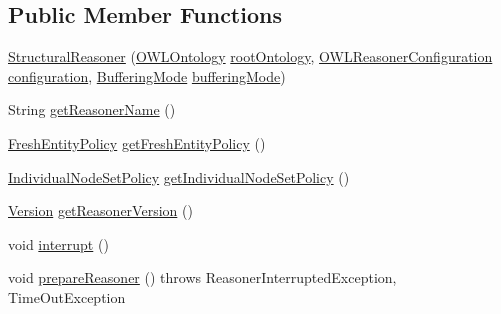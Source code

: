 \subsection*{Public Member Functions}
\begin{DoxyCompactItemize}
\item 
\hyperlink{classorg_1_1semanticweb_1_1owlapi_1_1reasoner_1_1structural_1_1_structural_reasoner_acdaac3191cd2a50bec6248fc02efab82}{Structural\-Reasoner} (\hyperlink{interfaceorg_1_1semanticweb_1_1owlapi_1_1model_1_1_o_w_l_ontology}{O\-W\-L\-Ontology} \hyperlink{classorg_1_1semanticweb_1_1owlapi_1_1reasoner_1_1impl_1_1_o_w_l_reasoner_base_a7fc931cb266522a2e131763fb69a02c4}{root\-Ontology}, \hyperlink{interfaceorg_1_1semanticweb_1_1owlapi_1_1reasoner_1_1_o_w_l_reasoner_configuration}{O\-W\-L\-Reasoner\-Configuration} \hyperlink{classorg_1_1semanticweb_1_1owlapi_1_1reasoner_1_1impl_1_1_o_w_l_reasoner_base_a4cbc08a1cf3914d8e9ab79c2236c4a88}{configuration}, \hyperlink{enumorg_1_1semanticweb_1_1owlapi_1_1reasoner_1_1_buffering_mode}{Buffering\-Mode} \hyperlink{classorg_1_1semanticweb_1_1owlapi_1_1reasoner_1_1impl_1_1_o_w_l_reasoner_base_a37f5f012eabc861364519447692648c0}{buffering\-Mode})
\item 
String \hyperlink{classorg_1_1semanticweb_1_1owlapi_1_1reasoner_1_1structural_1_1_structural_reasoner_af2e5597f57fdf2c4ef72ddf0dd0becda}{get\-Reasoner\-Name} ()
\item 
\hyperlink{enumorg_1_1semanticweb_1_1owlapi_1_1reasoner_1_1_fresh_entity_policy}{Fresh\-Entity\-Policy} \hyperlink{classorg_1_1semanticweb_1_1owlapi_1_1reasoner_1_1structural_1_1_structural_reasoner_a4f5d79b4b150e94e159b3ff11e3d5e6d}{get\-Fresh\-Entity\-Policy} ()
\item 
\hyperlink{enumorg_1_1semanticweb_1_1owlapi_1_1reasoner_1_1_individual_node_set_policy}{Individual\-Node\-Set\-Policy} \hyperlink{classorg_1_1semanticweb_1_1owlapi_1_1reasoner_1_1structural_1_1_structural_reasoner_a22791c39174dfb43f8fc6a36e1194dbd}{get\-Individual\-Node\-Set\-Policy} ()
\item 
\hyperlink{classorg_1_1semanticweb_1_1owlapi_1_1util_1_1_version}{Version} \hyperlink{classorg_1_1semanticweb_1_1owlapi_1_1reasoner_1_1structural_1_1_structural_reasoner_a3ea14db5464f5448840412c06e633361}{get\-Reasoner\-Version} ()
\item 
void \hyperlink{classorg_1_1semanticweb_1_1owlapi_1_1reasoner_1_1structural_1_1_structural_reasoner_a1e7856ff44c585b26d4557e2471d9c1d}{interrupt} ()
\item 
void \hyperlink{classorg_1_1semanticweb_1_1owlapi_1_1reasoner_1_1structural_1_1_structural_reasoner_a79741e5a5e89ff1bb50756bf81ae15f6}{prepare\-Reasoner} ()  throws Reasoner\-Interrupted\-Exception, Time\-Out\-Exception 

\end{DoxyCompactItemize}
